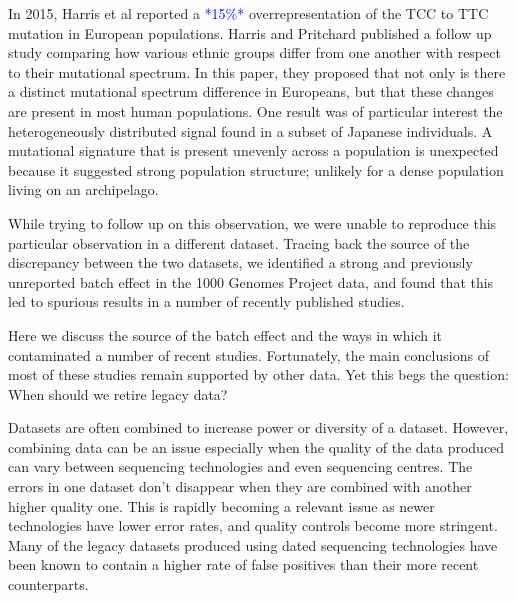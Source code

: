 \documentclass[9pt,lineno]{elife}
\newcommand{\sgcomment}[1]{\textcolor{blue}{SG: #1}}
\newcommand{\todo}[1]{\textcolor{blue}{*#1*}}
\begin{document}
In 2015, Harris et al reported a \todo{15\%} overrepresentation of the TCC to TTC mutation in European populations.
Harris and Pritchard published a follow up study comparing how various ethnic groups differ from one another with respect to their mutational spectrum. 
In this paper, they proposed that not only is there a distinct mutational spectrum difference in Europeans, but that these changes are present in most human populations. 
One result was of particular interest the heterogeneously distributed signal found in a subset of Japanese individuals. 
A mutational signature that is present unevenly across a population is unexpected because it suggested strong population structure; unlikely for a dense population living on an archipelago.

While trying to follow up on this observation, we were unable to reproduce this particular observation in a different dataset. Tracing back the source of the discrepancy between the two datasets, we identified a strong and previously unreported batch effect in the 1000 Genomes Project data, and found that this led to spurious results in a number of recently published studies. 

Here we discuss the source of the batch effect and the ways in which it contaminated a number of recent studies. Fortunately, the main conclusions of most of these studies remain supported by other data.  Yet this begs the question: When should we retire legacy data?





Datasets are often combined to increase power or diversity of a dataset.
However, combining data can be an issue especially when the quality of the data produced can vary between sequencing technologies and even sequencing centres.
The errors in one dataset don't disappear when they are combined with another higher quality one.
This is rapidly becoming a relevant issue as newer technologies have lower error rates, and quality controls become more stringent.
Many of the legacy datasets produced using dated sequencing technologies have been known to contain a higher rate of false positives than their more recent counterparts.
\end{document}
